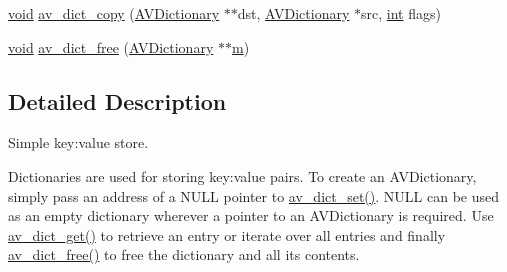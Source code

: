 \begin{DoxyCompactItemize}
\item 
\hyperlink{sound_8c_ae35f5844602719cf66324f4de2a658b3}{void} \hyperlink{group__lavu__dict_ga84757a064d7c4e5558389f1459958f8b}{av\+\_\+dict\+\_\+copy} (\hyperlink{group__lavu__dict_ga1d7cc0833bee918994a600556410315f}{A\+V\+Dictionary} $\ast$$\ast$dst, \hyperlink{group__lavu__dict_ga1d7cc0833bee918994a600556410315f}{A\+V\+Dictionary} $\ast$src, \hyperlink{xmltok_8h_a5a0d4a5641ce434f1d23533f2b2e6653}{int} flags)
\item 
\hyperlink{sound_8c_ae35f5844602719cf66324f4de2a658b3}{void} \hyperlink{group__lavu__dict_ga1bafd682b1fbb90e48a4cc3814b820f7}{av\+\_\+dict\+\_\+free} (\hyperlink{group__lavu__dict_ga1d7cc0833bee918994a600556410315f}{A\+V\+Dictionary} $\ast$$\ast$\hyperlink{layer3_8c_a4b8bfe70f28d6faddcb10d6ecf8c1989}{m})
\end{DoxyCompactItemize}


\subsection{Detailed Description}
Simple key\+:value store. 

Dictionaries are used for storing key\+:value pairs. To create an A\+V\+Dictionary, simply pass an address of a N\+U\+LL pointer to \hyperlink{group__lavu__dict_ga8d9c2de72b310cef8e6a28c9cd3acbbe}{av\+\_\+dict\+\_\+set()}. N\+U\+LL can be used as an empty dictionary wherever a pointer to an A\+V\+Dictionary is required. Use \hyperlink{group__lavu__dict_ga8140aee3afe5d5ccdf2d4a5eabb4a710}{av\+\_\+dict\+\_\+get()} to retrieve an entry or iterate over all entries and finally \hyperlink{group__lavu__dict_ga1bafd682b1fbb90e48a4cc3814b820f7}{av\+\_\+dict\+\_\+free()} to free the dictionary and all its contents.


